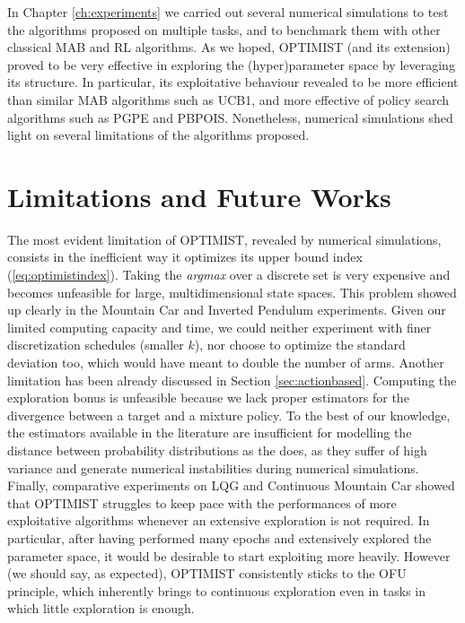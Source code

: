 In Chapter \ref{ch:experiments} we carried out several numerical simulations to test the algorithms proposed on multiple tasks, and to benchmark them with other classical \gls{MAB} and \gls{RL} algorithms. As we hoped, \gls{OPTIMIST} (and its extension) proved to be very effective in exploring the (hyper)parameter space by leveraging its structure. In particular, its exploitative behaviour revealed to be more efficient than similar \gls{MAB} algorithms such as \gls{UCB}1, and more effective of policy search algorithms such as \gls{PGPE} and \gls{PBPOIS}. Nonetheless, numerical simulations shed light on several limitations of the algorithms proposed.

\section{Limitations and Future Works}
The most evident limitation of \gls{OPTIMIST}, revealed by numerical simulations, consists in the inefficient way it optimizes its upper bound index (\ref{eq:optimistindex}). Taking the \emph{argmax} over a discrete set is very expensive and becomes unfeasible for large, multidimensional state spaces. This problem showed up clearly in the Mountain Car and Inverted Pendulum experiments. Given our limited computing capacity and time, we could neither experiment with finer discretization schedules (smaller $k$), nor choose to optimize the standard deviation too, which would have meant to double the number of arms. 
Another limitation has been already discussed in Section \ref{sec:actionbased}. Computing the exploration bonus is unfeasible because we lack proper estimators for the \Renyi divergence between a target and a mixture policy. To the best of our knowledge, the estimators available in the literature are insufficient for modelling the distance between probability distributions as the \Renyi does, as they suffer of high variance and generate numerical instabilities during numerical simulations. 
Finally, comparative experiments on \gls{LQG} and  Continuous Mountain Car showed that \gls{OPTIMIST} struggles to keep pace with the performances of more exploitative algorithms whenever an extensive exploration is not required. In particular, after having performed many epochs and extensively explored the parameter space, it would be desirable to start exploiting more heavily. However (we should say, as expected), \gls{OPTIMIST} consistently sticks to the \gls{OFU} principle, which inherently brings to continuous exploration even in tasks in which little exploration is enough.

